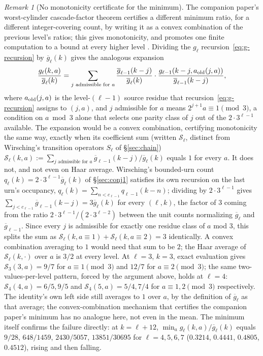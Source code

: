\documentclass[11pt]{article}
\theoremstyle{remark}
\newtheorem{remark}[theorem]{Remark}
\begin{document}
\begin{remark}[No monotonicity certificate for the minimum]
\label{rem:no-monotone-certificate}
The companion paper's worst-cylinder cascade-factor theorem certifies a
different minimum ratio, for a different integer-covering count, by
writing it as a convex combination of the previous level's ratios; this
gives monotonicity, and promotes one finite computation to a bound at
every higher level \cite{BarrierCompanion}. Dividing the $g_\ell$
recursion~\eqref{eq:g-recursion} by $\overline g_\ell(k)$
gives the analogous expansion
\[
 \frac{g_\ell(k,a)}{\overline g_\ell(k)}=
 \sum_{j\text{ admissible for }a}
 \frac{\overline g_{\ell-1}(k-j)}{\overline g_\ell(k)}\cdot
 \frac{g_{\ell-1}(k-j,a_{\rm old}(j,a))}{\overline g_{\ell-1}(k-j)},
\]
where $a_{\rm old}(j,a)$ is the level-$(\ell-1)$ source residue that
recursion~\eqref{eq:g-recursion} assigns to $(j,a)$,
and $j$ admissible for $a$ means $2^{j+1}a\equiv1\pmod3$, a condition
on $a\bmod3$ alone that selects one parity class of $j$ out of the
$2\cdot3^{\ell-1}$ available. The expansion would be a convex
combination, certifying monotonicity the same way, exactly when its
coefficient sum (written $\mathcal S_\ell$, distinct from Wirsching's
transition operators $S_\ell$ of \S\ref{sec:chain})
$\mathcal S_\ell(k,a):=\sum_{j\text{ admissible for }a}\overline
g_{\ell-1}(k-j)/\overline g_\ell(k)$ equals $1$ for every $a$. It does
not, and not even on Haar average. Wirsching's bounded-urn count
$q_\ell(k)=2\cdot3^{\ell-1}\overline g_\ell(k)$ of \S\ref{sec:conj1}
satisfies its own recursion on the last urn's occupancy,
$q_\ell(k)=\sum_{n<c_{\ell-1}}q_{\ell-1}(k-n)$; dividing by
$2\cdot3^{\ell-1}$ gives $\sum_{j<c_{\ell-1}}\overline
g_{\ell-1}(k-j)=3\overline g_\ell(k)$ for every $(\ell,k)$, the factor
of $3$ coming from the ratio $2\cdot3^{\ell-1}/(2\cdot3^{\ell-2})$
between the unit counts normalizing $\overline g_\ell$ and $\overline
g_{\ell-1}$. Since every $j$ is admissible for exactly one residue
class of $a$ mod $3$, this splits the sum as
$\mathcal S_\ell(k,a\equiv1)+\mathcal S_\ell(k,a\equiv2)=3$ identically.
A convex combination averaging to $1$ would need that sum to be $2$;
the Haar average of $\mathcal S_\ell(k,\cdot)$ over $a$
is $3/2$ at every level. At $\ell=3$, $k=3$,
exact evaluation gives $\mathcal S_3(3,a)=9/7$ for
$a\equiv1\pmod3$ and $12/7$ for $a\equiv2\pmod3$; the same
two-values-per-level pattern, forced by the argument above, holds at
$\ell=4$: $\mathcal S_4(4,a)=6/5,9/5$ and $\mathcal S_4(5,a)=5/4,7/4$
for $a\equiv1,2\pmod3$ respectively. The identity's own left side still averages to $1$
over $a$, by the definition of $\overline g_\ell$ as that average; the
convex-combination mechanism that certifies the companion paper's
minimum has no analogue here, not even in the mean. The minimum
itself confirms the failure directly: at $k=\ell+12$,
$\min_ag_\ell(k,a)/\overline g_\ell(k)$ equals $9/28$, $648/1459$,
$2430/5057$, $13851/30695$ for $\ell=4,5,6,7$ ($0.3214$, $0.4441$,
$0.4805$, $0.4512$), rising and then falling.
\end{remark}
\end{document}
